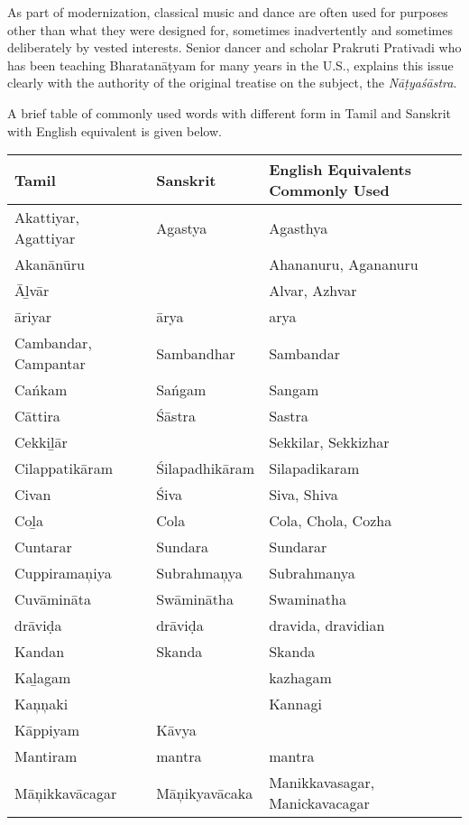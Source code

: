 As part of modernization, classical music and dance are often used for purposes other than what they were designed for, sometimes inadvertently and sometimes deliberately by vested interests. Senior dancer and scholar Prakruti Prativadi who has been teaching Bharatanāṭyam for many years in the U.S., explains this issue clearly with the authority of the original treatise on the subject, the \textit{Nāṭyaśāstra}.

A brief table of commonly used words with different form in Tamil and Sanskrit with English equivalent is given below.

\newpage

\begin{longtable}{|p{2.5cm}|p{2.5cm}|p{3cm}|}
\hline
Tamil & Sanskrit & English Equivalents Commonly Used \\
\hline
Akattiyar, Agattiyar & Agastya & Agasthya \\
\hline
Akanānūru &  & Ahananuru, Agananuru \\
\hline
Āḻvār &  & Alvar, Azhvar \\
\hline
āriyar & ārya & arya \\
\hline
Cambandar, Campantar & Sambandhar & Sambandar \\
\hline
Cańkam & Sańgam & Sangam \\
\hline
Cāttira & Śāstra & Sastra \\
\hline
Cekkiḻār &  & Sekkilar, Sekkizhar \\
\hline
Cilappatikāram & Śilapadhikāram & Silapadikaram \\
\hline
Civan & Śiva & Siva, Shiva \\
\hline
Coḻa & Cola & Cola, Chola, Cozha \\
\hline
Cuntarar & Sundara & Sundarar \\
\hline
Cuppiramaņiya & Subrahmaņya & Subrahmanya \\
\hline
Cuvāmināta & Swāminātha & Swaminatha \\
\hline
drāviḍa & drāviḍa & dravida, dravidian \\
\hline
Kandan & Skanda & Skanda \\
\hline
Kaḻagam &  & kazhagam \\
\hline
Kaņņaki &  & Kannagi \\
\hline
Kāppiyam & Kāvya &  \\
\hline
Mantiram & mantra & mantra \\
\hline
Māņikkavācagar & Māņikyavācaka & Manikkavasagar, Manickavacagar \\

\end{longtable}
